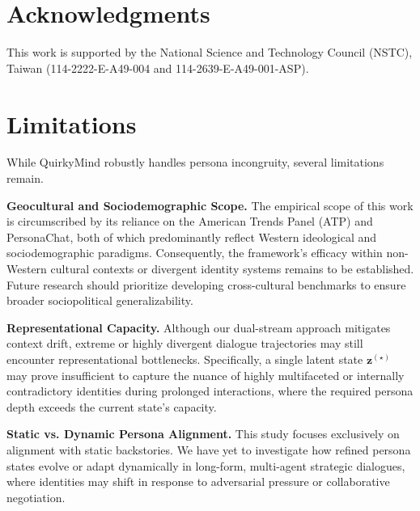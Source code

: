 \documentclass[11pt]{article}
\begin{document}
\section*{Acknowledgments}
This work is supported by the National Science and Technology Council (NSTC), Taiwan (114-2222-E-A49-004 and 114-2639-E-A49-001-ASP). 







\section*{Limitations}
While QuirkyMind robustly handles persona incongruity, several limitations remain. 


\noindent \textbf{Geocultural and Sociodemographic Scope.} The empirical scope of this work is circumscribed by its reliance on the American Trends Panel (ATP) and PersonaChat, both of which predominantly reflect Western ideological and sociodemographic paradigms. Consequently, the framework’s efficacy within non-Western cultural contexts or divergent identity systems remains to be established. Future research should prioritize developing cross-cultural benchmarks to ensure broader sociopolitical generalizability.

\noindent \textbf{Representational Capacity.} Although our dual-stream approach mitigates context drift, extreme or highly divergent dialogue trajectories may still encounter representational bottlenecks. Specifically, a single latent state $\textbf{z}^{(\star)}$ may prove insufficient to capture the nuance of highly multifaceted or internally contradictory identities during prolonged interactions, where the required persona depth exceeds the current state's capacity.

\noindent \textbf{Static vs. Dynamic Persona Alignment.} This study focuses exclusively on alignment with static backstories. We have yet to investigate how refined persona states evolve or adapt dynamically in long-form, multi-agent strategic dialogues, where identities may shift in response to adversarial pressure or collaborative negotiation.







\appendix
\newpage

\end{document}

